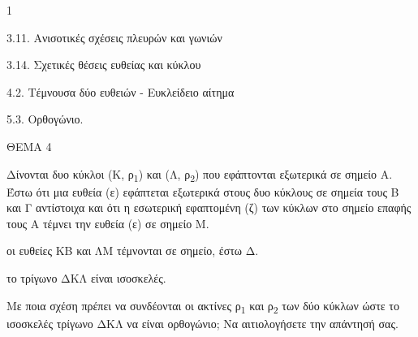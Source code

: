 \begin{ylh}{1}
    \item 3.11. Ανισοτικές σχέσεις πλευρών και γωνιών
    \item 3.14. Σχετικές θέσεις ευθείας και κύκλου
    \item 4.2. Τέμνουσα δύο ευθειών - Ευκλείδειο αίτημα
    \item 5.3. Ορθογώνιο.
\end{ylh}

ΘΕΜΑ 4

Δίνονται δυο κύκλοι (Κ, ρ\textsubscript{1}) και (Λ, ρ\textsubscript{2}) που εφάπτονται εξωτερικά σε σημείο Α. Έστω ότι μια ευθεία (ε) εφάπτεται εξωτερικά στους δυο κύκλους σε σημεία τους Β και Γ αντίστοιχα και ότι η εσωτερική εφαπτομένη (ζ) των κύκλων στο σημείο επαφής τους Α τέμνει την ευθεία (ε) σε σημείο Μ.

\begin{alist}
\item Να αποδείξετε ότι:

.}
\end{alist}
\begin{alist}
\item
  οι ευθείες ΚΒ και ΛΜ τέμνονται σε σημείο, έστω Δ. 
\item
  το τρίγωνο ΔΚΛ είναι ισοσκελές. 

\item Με ποια σχέση πρέπει να συνδέονται οι ακτίνες ρ\textsubscript{1} και ρ\textsubscript{2} των δύο κύκλων ώστε το ισοσκελές τρίγωνο ΔΚΛ να είναι ορθογώνιο; Να αιτιολογήσετε την απάντησή σας.

\end{alist}
